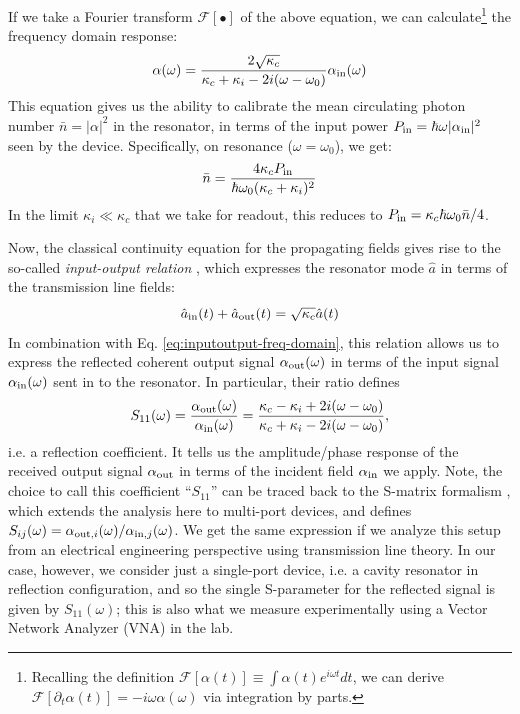 If we take a Fourier transform $\mathcal{F}[\bullet]$ of the above equation, we can calculate\footnote{Recalling the definition $\mathcal{F}[\alpha(t)] \equiv \int \alpha(t) e^{i\omega t}dt$, we can derive $\mathcal{F}[\partial_t\alpha(t)] = -i\omega \alpha(\omega)$ via integration by parts.} the frequency domain response:
\begin{equation}
    \alpha(\omega) = \frac{2\sqrt{\kappa_c}}{\kappa_c + \kappa_i - 2i(\omega-\omega_0)} \alpha_{\rm in}(\omega)
    \label{eq:inputoutput-freq-domain}
\end{equation}
This equation gives us the ability to calibrate the mean circulating photon number $\bar{n} = |\alpha|^2$ in the resonator, in terms of the input power $P_{\rm in} = \hbar\omega |\alpha_{\rm in}|^2$ seen by the device. Specifically, on resonance ($\omega = \omega_0$), we get:
\begin{equation}
    \bar{n} = \frac{4\kappa_c P_{\rm in}}{\hbar\omega_0(\kappa_c + \kappa_i)^2}
\end{equation}
In the limit $\kappa_i \ll \kappa_c$ that we take for readout, this reduces to $P_{\rm in} = \kappa_c\hbar\omega_0 \bar{n}/4$. 

\noindent Now, the classical continuity equation for the propagating fields gives rise to the so-called \textit{input-output relation} \cite{clerk2010introduction}, which expresses the resonator mode $\hat{a}$ in terms of the transmission line fields: 
\begin{equation}
    \hat{a}_{\rm in}(t) + \hat{a}_{\rm out}(t) = \sqrt{\kappa_c} \hat{a}(t)
    \label{eq:inputoutput}
\end{equation}
In combination with Eq. \eqref{eq:inputoutput-freq-domain}, this relation allows us to express the reflected coherent output signal $\alpha_{\rm out}(\omega)$ in terms of the input signal $\alpha_{\rm in}(\omega)$ sent in to the resonator. In particular, their ratio defines
\begin{equation}
   S_{11}(\omega) = \frac{\alpha_{\rm out}(\omega)}{\alpha_{\rm in}(\omega)} = \frac{\kappa_c - \kappa_i + 2i(\omega - \omega_0)}{\kappa_c + \kappa_i - 2i(\omega - \omega_0)},
   \label{eq:A_S11_ideal}
\end{equation}
i.e. a reflection coefficient. It tells us the amplitude/phase response of the received output signal  $\alpha_{\rm out}$ in terms of the incident field $\alpha_{\rm in}$ we apply. Note, the choice to call this coefficient ``$S_{11}$'' can be traced back to the S-matrix formalism \cite{kurokawa1965power, gardiner1985input}, which extends the analysis here to multi-port devices, and defines $S_{ij}(\omega) = \alpha_{{\rm out}, i}(\omega)/\alpha_{{\rm in}, j}(\omega)$. We get the same expression if we analyze this setup from an electrical engineering perspective using transmission line theory. In our case, however, we consider just a single-port device, i.e. a cavity resonator in reflection configuration, and so the single S-parameter for the reflected signal is given by $S_{11}(\omega)$; this is also what we measure experimentally using a Vector Network Analyzer (VNA) in the lab.  


